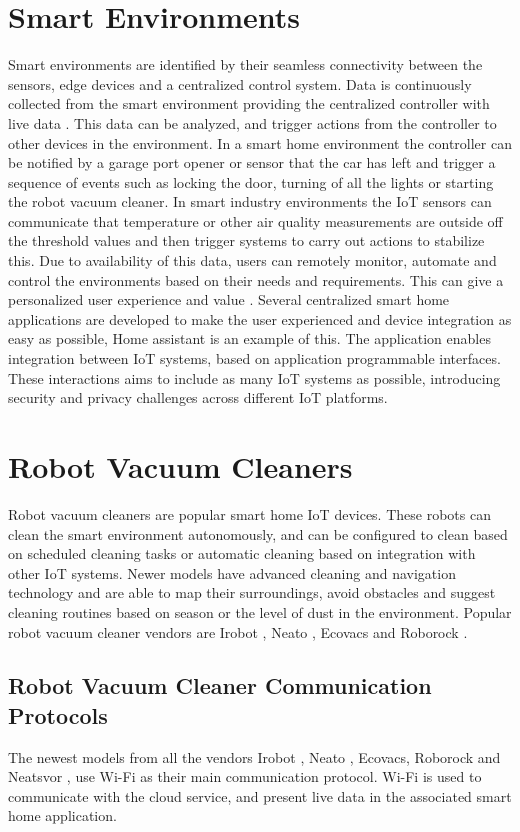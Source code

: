 \section{Smart Environments}
Smart environments are identified by their seamless connectivity between the sensors, edge devices and a centralized control system. Data is continuously collected from the smart environment providing the centralized controller with live data \cite{lin2016iot}. This data can be analyzed, and trigger actions from the controller to other devices in the environment. In a smart home environment the controller can be notified by a garage port opener or sensor that the car has left and trigger a sequence of events such as locking the door, turning of all the lights or starting the robot vacuum cleaner. In smart industry environments the \gls{IoT} sensors can communicate that temperature or other air quality measurements are outside off the threshold values and then trigger systems to carry out actions to stabilize this. Due to availability of this data, users can remotely monitor, automate and control the environments based on their needs and requirements. This can give a personalized user experience and value \cite{mantas2011security}. Several centralized smart home applications are developed to make the user experienced and device integration as easy as possible, Home assistant \cite{homeassistant2023} is an example of this. The application enables integration between \gls{IoT} systems, based on application programmable interfaces. These interactions aims to include as many \gls{IoT} systems as possible, introducing security and privacy challenges across different \gls{IoT} platforms. 

\section{Robot Vacuum Cleaners}
Robot vacuum cleaners are popular smart home \gls{IoT} devices. These robots can clean the smart environment autonomously, and can be configured to clean based on scheduled cleaning tasks or automatic cleaning based on integration with other \gls{IoT} systems. Newer models have advanced cleaning and navigation technology and are able to map their surroundings, avoid obstacles and suggest cleaning routines based on season or the level of dust in the environment. Popular robot vacuum cleaner vendors are Irobot \cite{irobot}, Neato \cite{Neato}, Ecovacs \cite{ecovacs} and Roborock \cite{roborock}. 


\subsection{Robot Vacuum Cleaner Communication Protocols}
The newest models from all the vendors Irobot \cite{irobot}, Neato \cite{Neato}, Ecovacs\cite{ecovacs}, Roborock\cite{roborock} and Neatsvor \cite{neatsvor}, use \gls{Wi-Fi} as their main communication protocol. \gls{Wi-Fi} is used to communicate with the cloud service, and present live data in the associated smart home application.

